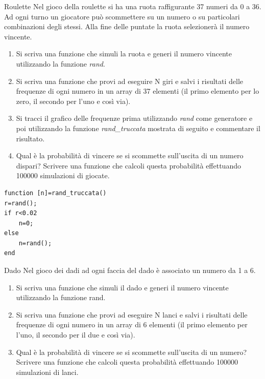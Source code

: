 \documentclass[format=169, handout]{beamer}
\begin{document}
\begin{frame}{Roulette}
	Nel gioco della roulette si ha una ruota raffigurante 37
	numeri da 0 a 36. Ad ogni turno un giocatore può
	scommettere su un numero o su particolari combinazioni
	degli stessi. Alla fine delle puntate la ruota selezionerà il
	numero vincente.
	
	\begin{enumerate}
		\item Si scriva una funzione che simuli la ruota e generi il
		numero vincente utilizzando la funzione \emph{rand}.
		\item Si scriva una funzione che provi ad eseguire N giri e salvi
		i risultati delle frequenze di ogni numero in un array di
		37 elementi (il primo elemento per lo zero, il secondo per
		l'uno e così via).
		\item Si tracci il grafico delle frequenze prima utilizzando
		\emph{rand} come generatore e poi utilizzando la funzione
		\emph{rand\_truccata} mostrata di seguito e commentare il
		risultato.
		\item Qual è la probabilità di vincere se si scommette
		sull'uscita di un numero dispari? Scrivere una funzione
		che calcoli questa probabilità effettuando 100000
		simulazioni di giocate.
	\end{enumerate}
	
	\framebreak
\begin{lstlisting}[style=matlab]
function [n]=rand_truccata()
r=rand();
if r<0.02
    n=0;
else
    n=rand();
end
\end{lstlisting}
\end{frame}

\begin{frame}{Dado}
	Nel gioco dei dadi ad ogni faccia del dado è associato un
	numero da 1 a 6.
	
	\begin{enumerate}
		\item Si scriva una funzione che simuli il dado e generi il
		numero vincente utilizzando la funzione rand.
		\item Si scriva una funzione che provi ad eseguire N lanci e
		salvi i risultati delle frequenze di ogni numero in un array
		di 6 elementi (il primo elemento per l’uno, il secondo per
		il due e così via).
		\item Qual è la probabilità di vincere se si scommette
		sull'uscita di un numero? Scrivere una funzione che
		calcoli questa probabilità effettuando 100000 simulazioni
		di lanci.
	\end{enumerate}
\end{frame}

\end{document}
